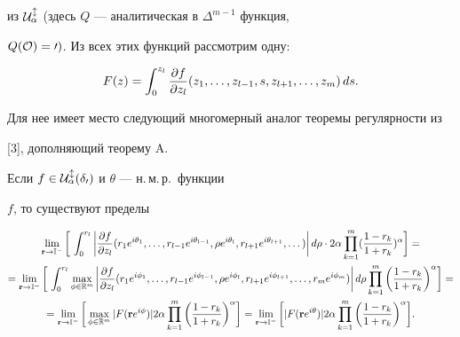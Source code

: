 из $\cal U^l_\alpha$ (здесь $Q$ --- аналитическая в $\Delta^{m-1}$ функция,


$Q(\cal O)=0)$. Из всех этих функций рассмотрим одну:


$$


F(z)=\int_0^{z_l}\pol (z_1,\cd,z_{l-1},s,z_{l+1},\cd,z_m)\, ds.


$$


Для нее имеет место следующий многомерный аналог теоремы регулярности из


[3], дополняющий теорему A.





\begin{thm}


Если $f\in\cal U^l_\alpha(\delta_0)$ и $\theta$ --- н.\,м.\,р.~функции


$f$, то существуют пределы


\begin{multline*}


\lim_{\bold r\to\Bbb


I^-}\bigg[\,\int_0^{r_l}\bigg|\pol(r_1e^{i\theta_1},\cd,r_{l-1}e^{i\theta_{l-


1}},\rho e^{i\theta_l},


r_{l+1}e^{i\theta_{l+1}},\cd)\bigg|\, d\rho\cdot


2\alpha\prod_{k=1}^m(\frac{1-r_k}{1+r_k})^\alpha\bigg]= \\


%


=\lim_{\bold r\to\Bbb I^-}\bigg[\,\int_0^{r_l}\max_{\phi\in\Bbb R^m}


\bigg|\pol (r_1e^{i\phi_1},\cd,r_{l-1}e^{i\phi_{l-1}},\rho e^{i\phi_l},


r_{l+1}e^{i\phi_{l+1}},\cd,r_me^{i\phi_m})\bigg|\, d\rho


\prod_{k=1}^m\bigg(\frac{1-r_k}{1+r_k}\bigg)^\alpha\bigg]= \\


%


=\lim_{\bold r\to\Bbb


I^-}\bigg[\max_{\phi\in\Bbb R^m}|F(\bold r


e^{i\phi})|2\alpha\prod_{k=1}^m\bigg(\frac{1-r_k}{1+r_k}\bigg)^\alpha


\bigg]=\lim_{\bold r\to\Bbb I^-}\bigg[|F(\bold r


e^{i\theta})|2\alpha\prod_{k=1}^m\bigg(\frac{1-r_k}{1+r_k}\bigg)^\alpha


\bigg].


\end{multline*}


\end{thm}





